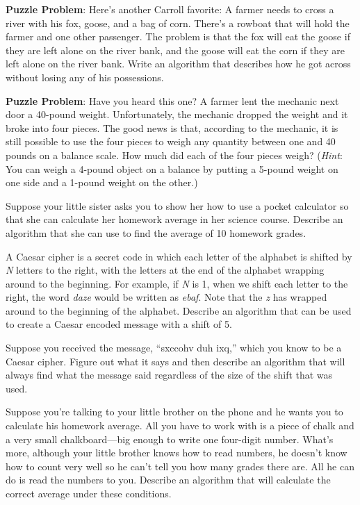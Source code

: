 \begin{EXRtwo}
\item  {\bf Puzzle Problem}: Here's another Carroll favorite: A farmer needs to
cross a river with his fox, goose, and a bag of corn.  There's a
rowboat that will hold the farmer and one other passenger.  The
problem is that the fox will eat the goose if they are left alone on
the river bank, and the goose will eat the corn if they are left alone
on the river bank.  Write an algorithm that describes how he got
across without losing any of his possessions.

\item  {\bf Puzzle Problem}: Have you heard this one? A farmer lent 
the mechanic
next door a 40-pound weight.  Unfortunately, the mechanic dropped the
weight and it broke into four pieces.  The good news is that, according
to the mechanic, it is still possible to use the four pieces to weigh
any quantity between one and 40 pounds on a balance scale.   How much
did each of the four pieces weigh? ({\it Hint}: You can weigh a 4-pound
object on a balance by putting a 5-pound weight on one side and a
1-pound weight on the other.)

\item  Suppose your little sister asks you to show her how to
use a pocket calculator so that she can calculate her homework average
in her science course.  Describe an algorithm that she can use to find
the average of 10 homework grades.

\item  A Caesar cipher is a secret code in which each letter
of the alphabet is shifted by {\it N} letters to the right, with the
letters at the end of the alphabet wrapping around to the beginning.
For example, if {\it N} is 1, when we shift each letter to the right,
the word {\it daze} would be written as {\it ebaf}.  Note that the
{\it z} has wrapped around to the beginning of the alphabet.  Describe
an algorithm that can be used to create a Caesar encoded message with
a shift of 5.


\item  Suppose you received the message, ``sxccohv duh ixq,'' which
you know to be a Caesar cipher.  Figure out what it says and then
describe an algorithm that will always find what the message said
regardless of the size of the shift that was used.

\item  Suppose you're talking to your little brother on the phone and
he wants you to calculate his homework average.  All you have to work
with is a piece of chalk and a very small chalkboard---big enough to
write one four-digit number.  What's more, although your little brother
knows how to read numbers, he doesn't know how to count very well so
he can't tell you how many grades there are.  All he can do is read the
numbers to you.  Describe an algorithm that will calculate the correct
average under these conditions.


\end{EXRtwo}
